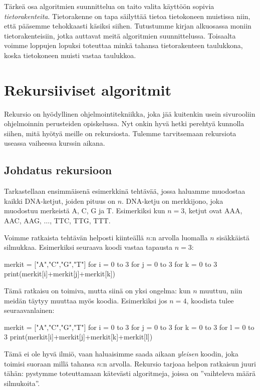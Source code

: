 Tärkeä osa algoritmien suunnittelua on taito valita käyttöön
sopivia \emph{tietorakenteita}.
Tietorakenne on tapa säilyttää tietoa tietokoneen muistissa
niin, että pääsemme tehokkaasti käsiksi siihen.
Tutustumme kirjan alku\-osassa moniin tietorakenteisiin,
jotka auttavat meitä algoritmien suunnittelussa.
Toisaalta voimme loppujen
lopuksi toteuttaa minkä tahansa tietorakenteen taulukkona,
koska tietokoneen muisti vastaa taulukkoa.

\section{Rekursiiviset algoritmit}

Rekursio on hyödyllinen ohjelmointitekniikka,
joka jää kuitenkin usein sivurooliin ohjelmoinnin perusteiden opiskelussa.
Nyt onkin hyvä hetki perehtyä kunnolla siihen,
mitä hyötyä meille on rekursiosta.
Tulemme tarvitsemaan rekursiota useassa vaiheessa kurssin aikana.

\subsection{Johdatus rekursioon}

Tarkastellaan ensimmäisenä esimerkkinä tehtävää,
jossa haluamme muodostaa kaikki DNA-ketjut,
joiden pituus on $n$.
DNA-ketju on merkkijono, joka muodostuu merkeistä A, C, G ja T.
Esimerkiksi kun $n=3$, ketjut ovat AAA, AAC, AAG, $\dots$, TTC, TTG, TTT.

Voimme ratkaista tehtävän helposti kiinteällä $n$:n arvolla
luomalla $n$ sisäk\-käistä silmukkaa.
Esimerkiksi seuraava koodi vastaa tapausta $n=3$:

\begin{code}
merkit = ["A","C","G","T"]
for i = 0 to 3
    for j = 0 to 3
        for k = 0 to 3
            print(merkit[i]+merkit[j]+merkit[k])
\end{code}

Tämä ratkaisu on toimiva, mutta siinä on yksi ongelma:
kun $n$ muuttuu, niin meidän täytyy muuttaa myös koodia.
Esimerkiksi jos $n=4$, koodista tulee seuraavanlainen:

\begin{code}
merkit = ["A","C","G","T"]
for i = 0 to 3
    for j = 0 to 3
        for k = 0 to 3
            for l = 0 to 3
                print(merkit[i]+merkit[j]+merkit[k]+merkit[l])
\end{code}

Tämä ei ole hyvä ilmiö, vaan haluaisimme saada aikaan \emph{yleisen}
koodin, joka toimisi suoraan millä tahansa $n$:n arvolla.
Rekursio tarjoaa helpon ratkaisun juuri tähän:
pystymme toteuttamaan kätevästi algoritmeja, joissa on
''vaihteleva määrä silmukoita''.

